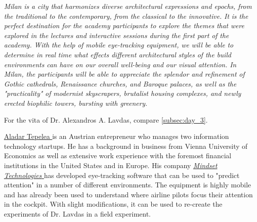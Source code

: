 \documentclass{article}
\begin{document}
\textit{Milan is a city that harmonizes diverse architectural expressions and epochs, from the traditional to the contemporary, from the classical to the innovative. It is the perfect destination for the academy participants to explore the themes that were explored in the lectures and interactive sessions during the first part of the academy. With the help of mobile eye-tracking equipment, we will be able to determine in real time what effects different architectural styles of the build environments can have on our overall well-being and our visual attention. In Milan, the participants will be able to appreciate the splendor and refinement of Gothic cathedrals, Renaissance churches, and Baroque palaces, as well as the "practicality" of modernist skyscrapers, brutalist housing complexes, and newly erected biophilic towers, bursting with greenery. }

For the vita of Dr. Alexandros A. Lavdas, compare \cref{subsec:day_3}.

\href{https://www.linkedin.com/in/aladar-tepelea/}{Aladar Tepelea \ExternalLink} is an Austrian entrepreneur who manages two information technology startups. He has a background in business from Vienna University of Economics as well as extensive work experience with the foremost financial institutions in the United States and in Europe. His company \href{https://www.mindset-technologies.at}{\textit{Mindset Technologies} \ExternalLink} has developed eye-tracking software that can be used to "predict attention" in a number of different environments. The equipment is highly mobile and has already been used to understand where airline pilots focus their attention in the cockpit. With slight modifications, it can be used to re-create the experiments of Dr. Lavdas in a field experiment. 
\end{document}

